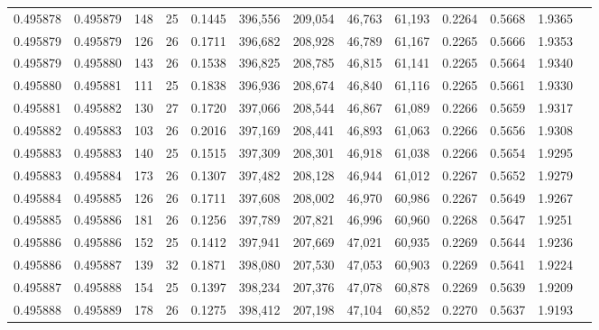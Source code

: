 \begin{tabular}{rrrrrrrrrrrrr}
0.495878 & 0.495879 & 148 &  25 &                                     0.1445 & 396,556 & 209,054 &  46,763 &  61,193 & 0.2264 & 0.5668 & 1.9365 \\
0.495879 & 0.495879 & 126 &  26 &                                     0.1711 & 396,682 & 208,928 &  46,789 &  61,167 & 0.2265 & 0.5666 & 1.9353 \\
0.495879 & 0.495880 & 143 &  26 &                                     0.1538 & 396,825 & 208,785 &  46,815 &  61,141 & 0.2265 & 0.5664 & 1.9340 \\
0.495880 & 0.495881 & 111 &  25 &                                     0.1838 & 396,936 & 208,674 &  46,840 &  61,116 & 0.2265 & 0.5661 & 1.9330 \\
0.495881 & 0.495882 & 130 &  27 &                                     0.1720 & 397,066 & 208,544 &  46,867 &  61,089 & 0.2266 & 0.5659 & 1.9317 \\
0.495882 & 0.495883 & 103 &  26 &                                     0.2016 & 397,169 & 208,441 &  46,893 &  61,063 & 0.2266 & 0.5656 & 1.9308 \\
0.495883 & 0.495883 & 140 &  25 &                                     0.1515 & 397,309 & 208,301 &  46,918 &  61,038 & 0.2266 & 0.5654 & 1.9295 \\
0.495883 & 0.495884 & 173 &  26 &                                     0.1307 & 397,482 & 208,128 &  46,944 &  61,012 & 0.2267 & 0.5652 & 1.9279 \\
0.495884 & 0.495885 & 126 &  26 &                                     0.1711 & 397,608 & 208,002 &  46,970 &  60,986 & 0.2267 & 0.5649 & 1.9267 \\
0.495885 & 0.495886 & 181 &  26 &                                     0.1256 & 397,789 & 207,821 &  46,996 &  60,960 & 0.2268 & 0.5647 & 1.9251 \\
0.495886 & 0.495886 & 152 &  25 &                                     0.1412 & 397,941 & 207,669 &  47,021 &  60,935 & 0.2269 & 0.5644 & 1.9236 \\
0.495886 & 0.495887 & 139 &  32 &                                     0.1871 & 398,080 & 207,530 &  47,053 &  60,903 & 0.2269 & 0.5641 & 1.9224 \\
0.495887 & 0.495888 & 154 &  25 &                                     0.1397 & 398,234 & 207,376 &  47,078 &  60,878 & 0.2269 & 0.5639 & 1.9209 \\
0.495888 & 0.495889 & 178 &  26 &                                     0.1275 & 398,412 & 207,198 &  47,104 &  60,852 & 0.2270 & 0.5637 & 1.9193 \\

\end{tabular}
